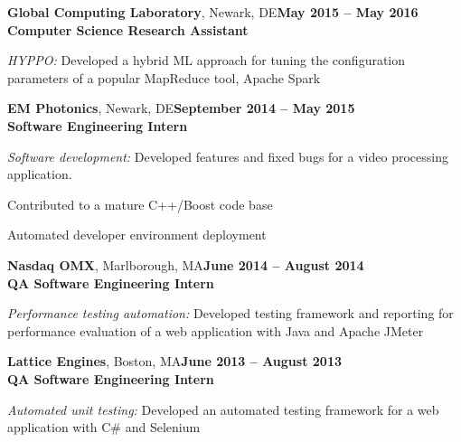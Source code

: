 \documentclass[margin,line]{resume}
\begin{document}
\begin{resume}
\textbf{Global Computing Laboratory}, Newark, DE\hfill\textbf{May 2015 -- May 2016}\\
\textbf{Computer Science Research Assistant}\hfill 
\vspace{-3mm}\\\vspace{-1mm}
\begin{list2}
	\item \filbreak\textit{HYPPO:} Developed a hybrid ML approach for tuning the
    configuration parameters of a popular MapReduce tool, Apache Spark
\end{list2}

\textbf{EM Photonics}, Newark, DE\hfill\textbf{September 2014 -- May 2015}\\
\textbf{Software Engineering Intern}\hfill 
\vspace{-3mm}\\\vspace{-1mm}
\begin{list2}
	\item \filbreak\textit{Software development:} Developed features and fixed bugs for a video processing application.
    \item \filbreak Contributed to a mature C++/Boost code base
    \item \filbreak Automated developer environment deployment
\end{list2}

\textbf{Nasdaq OMX}, Marlborough, MA\hfill\textbf{June 2014 -- August 2014}\\
\textbf{QA Software Engineering Intern}\hfill 
\vspace{-3mm}\\\vspace{-1mm}
\begin{list2}
	\item \filbreak\textit{Performance testing automation:} Developed testing framework and reporting
    for performance evaluation of a web application with Java and Apache JMeter
\end{list2}

\textbf{Lattice Engines}, Boston, MA\hfill\textbf{June 2013 -- August 2013}\\
\textbf{QA Software Engineering Intern}\hfill 
\vspace{-3mm}\\\vspace{-1mm}
\begin{list2}
	\item \filbreak\textit{Automated unit testing:} Developed an automated testing framework
    for a web application with C\# and Selenium
\end{list2}


\end{resume}
\end{document}
